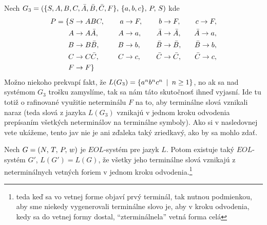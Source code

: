 \begin{priklad}
  \label{efko}
  Nech $G_3 = (\{S,A,B,C,\bar{A},\bar{B},\bar{C},F\},\,\{a,b,c\},\,P,\,S)$
  kde
  \begin{alignat*}{4}
    P = \{
      S &\rightarrow ABC,\quad & a &\rightarrow F, \quad
          & b &\rightarrow F, \quad & c \rightarrow F,\\
      A &\rightarrow A\bar{A}, & A &\rightarrow a,
          & \bar{A} &\rightarrow \bar{A}, &\bar{A} \rightarrow a,\\
      B &\rightarrow B\bar{B}, & B &\rightarrow b, 
          & \bar{B} &\rightarrow \bar{B}, &\bar{B} \rightarrow b,\\
      C &\rightarrow C\bar{C}, & C &\rightarrow c,
          & \bar{C} &\rightarrow \bar{C}, &\bar{C} \rightarrow c,\\
      F &\rightarrow F \}
  \end{alignat*}
  Možno niekoho prekvapí fakt, že
  $L(G_3) = \{a^n b^n c^n \enspace |\enspace n \ge 1\}$,
  no ak sa nad systémom $G_3$ trošku zamyslíme, tak sa
  nám táto skutočnosť ihneď vyjasní. Ide tu totiž o rafinované
  využitie neterminálu $F$ na to, aby terminálne slová vznikali
  naraz (teda slová z jazyka $L(G_3)$ vznikajú v jednom kroku
  odvodenia prepísaním všetkých neterminálov na terminálne symboly).
  Ako si v nasledovnej vete ukážeme, tento jav nie je ani zďaleka
  taký zriedkavý, ako by sa mohlo zdať.
\end{priklad}

\begin{veta}
  Nech $G = (N,\,T,\,P,\,w)$ je $EOL$-systém pre jazyk $L$.
  Potom existuje taký $EOL$-systém $G'$, $L(G') = L(G)$,
  že všetky jeho terminálne slová vznikajú z neterminálnych vetných foriem
  v jednom kroku odvodenia.\footnote{teda keď sa vo vetnej forme objaví prvý
    terminál, tak nutnou podmienkou, aby sme niekedy vygenerovali
    terminálne slovo je, aby v kroku odvodenia, kedy sa do vetnej
    formy dostal, ``zterminálnela'' vetná forma celá
  }
\end{veta}

